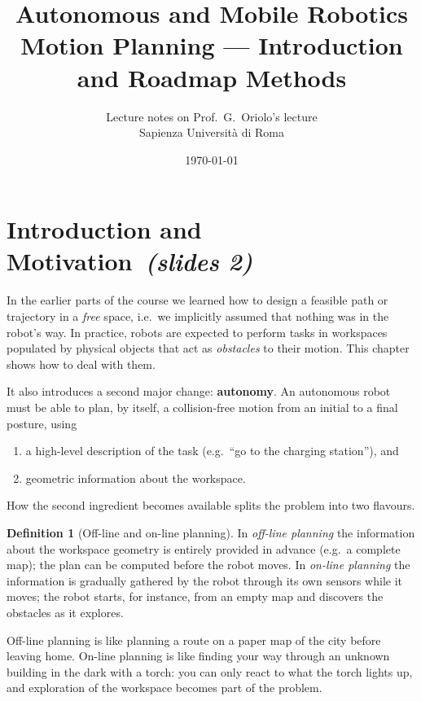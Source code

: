 \documentclass[11pt,a4paper]{article}
\title{\textbf{Autonomous and Mobile Robotics}\\[4pt]\Large Motion Planning --- Introduction and Roadmap Methods}
\author{Lecture notes on Prof.\ G.\ Oriolo's lecture\\ Sapienza Universit\`a di Roma}
\date{\today}
\newcommand{\slides}[1]{\emph{(slides #1)}}
\newcommand{\sect}[2]{\section{#1\texorpdfstring{\ \slides{#2}}{ (slides #2)}}}
\theoremstyle{definition}
\newtheorem{definition}{Definition}[section]
\theoremstyle{plain}
\theoremstyle{remark}
\begin{document}
\maketitle
\tableofcontents
\bigskip

\sect{Introduction and Motivation}{2}

In the earlier parts of the course we learned how to design a feasible path or trajectory in a \emph{free} space, i.e.\ we implicitly assumed that nothing was in the robot's way. In practice, robots are expected to perform tasks in workspaces populated by physical objects that act as \emph{obstacles} to their motion. This chapter shows how to deal with them.

It also introduces a second major change: \textbf{autonomy}. An autonomous robot must be able to plan, by itself, a collision-free motion from an initial to a final posture, using

\begin{enumerate}[label=(\arabic*)]
  \item a high-level description of the task (e.g.\ ``go to the charging station''), and
  \item geometric information about the workspace.
\end{enumerate}

How the second ingredient becomes available splits the problem into two flavours.

\begin{definition}[Off-line and on-line planning]
In \emph{off-line planning} the information about the workspace geometry is entirely provided in advance (e.g.\ a complete map); the plan can be computed before the robot moves. In \emph{on-line planning} the information is gradually gathered by the robot through its own sensors while it moves; the robot starts, for instance, from an empty map and discovers the obstacles as it explores.
\end{definition}

\begin{intuition}
Off-line planning is like planning a route on a paper map of the city before leaving home. On-line planning is like finding your way through an unknown building in the dark with a torch: you can only react to what the torch lights up, and exploration of the workspace becomes part of the problem.
\end{intuition}
\end{document}
